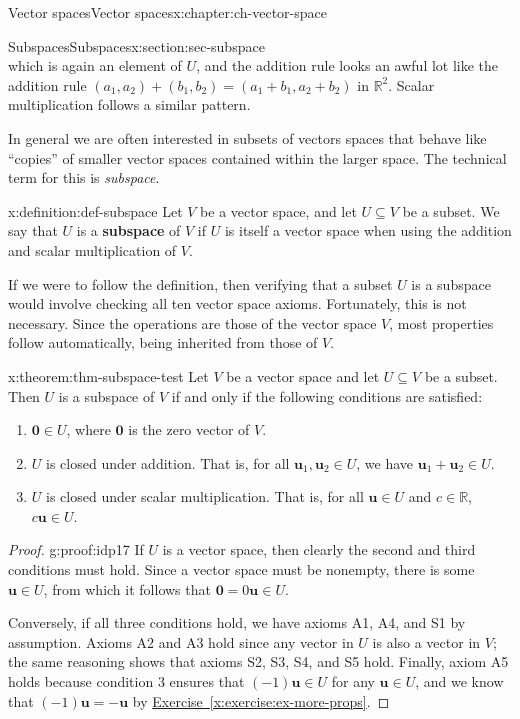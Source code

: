 \documentclass[oneside,10pt,]{book}
\newcommand{\xreffont}{\relax}
\newcommand{\terminology}[1]{\textbf{#1}}
\numberwithin{equation}{section}
\newcommand{\R}{\mathbb{R}}
\newcommand{\uu}{\mathbf{u}}
\newcommand{\zer}{\mathbf{0}}
\begin{document}
\begin{chapterptx}{Vector spaces}{}{Vector spaces}{}{}{x:chapter:ch-vector-space}
\begin{sectionptx}{Subspaces}{}{Subspaces}{}{}{x:section:sec-subspace}
\begin{equation*}
\end{equation*}
which is again an element of \(U\), and the addition rule looks an awful lot like the addition rule \((a_1,a_2)+(b_1,b_2)=(a_1+b_1,a_2+b_2)\) in \(\R^2\). Scalar multiplication follows a similar pattern.%
\par
In general we are often interested in subsets of vectors spaces that behave like ``copies'' of smaller vector spaces contained within the larger space. The technical term for this is \emph{subspace}.%
\begin{definition}{}{x:definition:def-subspace}%
Let \(V\) be a vector space, and let \(U\subseteq V\) be a subset. We say that \(U\) is a \terminology{subspace} of \(V\) if \(U\) is itself a vector space when using the addition and scalar multiplication of \(V\).%
\end{definition}
If we were to follow the definition, then verifying that a subset \(U\) is a subspace would involve checking all ten vector space axioms. Fortunately, this is not necessary. Since the operations are those of the vector space \(V\), most properties follow automatically, being inherited from those of \(V\).%
\begin{theorem}{}{}{x:theorem:thm-subspace-test}%
Let \(V\) be a vector space and let \(U\subseteq V\) be a subset. Then \(U\) is a subspace of \(V\) if and only if the following conditions are satisfied:%
\begin{enumerate}
\item{}\(\zer\in U\), where \(\zer\) is the zero vector of \(V\).%
\item{}\(U\) is closed under addition. That is, for all \(\uu_1,\uu_2\in U\), we have \(\uu_1+\uu_2\in U\).%
\item{}\(U\) is closed under scalar multiplication. That is, for all \(\uu\in U\) and \(c\in\R\), \(c\uu\in U\).%
\end{enumerate}
%
\end{theorem}
\begin{proof}{}{g:proof:idp17}
If \(U\) is a vector space, then clearly the second and third conditions must hold. Since a vector space must be nonempty, there is some \(\uu\in U\), from which it follows that \(\zer=0\uu\in U\).%
\par
Conversely, if all three conditions hold, we have axioms A1, A4, and S1 by assumption. Axioms A2 and A3 hold since any vector in \(U\) is also a vector in \(V\); the same reasoning shows that axioms S2, S3, S4, and S5 hold. Finally, axiom A5 holds because condition 3 ensures that \((-1)\uu\in U\) for any \(\uu\in U\), and we know that \((-1)\uu=-\uu\) by \hyperref[x:exercise:ex-more-props]{Exercise~{\xreffont\ref{x:exercise:ex-more-props}}}.%

\end{proof}
\end{sectionptx}
\end{chapterptx}
\end{document}
